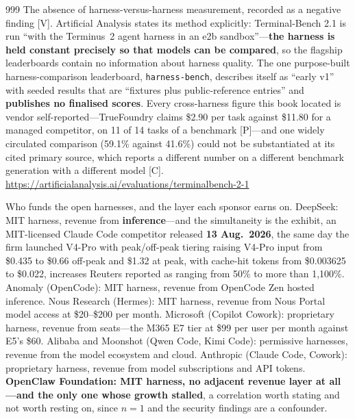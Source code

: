 \begin{thebibliography}{999}
 The absence of harness-versus-harness measurement, recorded as a negative finding [V]. Artificial Analysis states its method explicitly: Terminal-Bench 2.1 is run ``with the Terminus~2 agent harness in an e2b sandbox''---\textbf{the harness is held constant precisely so that models can be compared}, so the flagship leaderboards contain no information about harness quality. The one purpose-built harness-comparison leaderboard, \texttt{harness-bench}, describes itself as ``early v1'' with seeded results that are ``fixtures plus public-reference entries'' and \textbf{publishes no finalised scores}. Every cross-harness figure this book located is vendor self-reported---TrueFoundry claims \$2.90 per task against \$11.80 for a managed competitor, on 11 of 14 tasks of a benchmark [P]---and one widely circulated comparison (59.1\% against 41.6\%) could not be substantiated at its cited primary source, which reports a different number on a different benchmark generation with a different model [C]. \url{https://artificialanalysis.ai/evaluations/terminalbench-2-1}

 Who funds the open harnesses, and the layer each sponsor earns on. DeepSeek: MIT harness, revenue from \textbf{inference}---and the simultaneity is the exhibit, an MIT-licensed Claude Code competitor released \textbf{13 Aug.\ 2026}, the same day the firm launched V4-Pro with peak/off-peak tiering raising V4-Pro input from \$0.435 to \$0.66 off-peak and \$1.32 at peak, with cache-hit tokens from \$0.003625 to \$0.022, increases Reuters reported as ranging from 50\% to more than 1,100\%. Anomaly (OpenCode): MIT harness, revenue from OpenCode Zen hosted inference. Nous Research (Hermes): MIT harness, revenue from Nous Portal model access at \$20--\$200 per month. Microsoft (Copilot Cowork): proprietary harness, revenue from seats---the M365 E7 tier at \$99 per user per month against E5's \$60. Alibaba and Moonshot (Qwen Code, Kimi Code): permissive harnesses, revenue from the model ecosystem and cloud. Anthropic (Claude Code, Cowork): proprietary harness, revenue from model subscriptions and API tokens. \textbf{OpenClaw Foundation: MIT harness, no adjacent revenue layer at all---and the only one whose growth stalled}, a correlation worth stating and not worth resting on, since $n=1$ and the security findings are a confounder.


\end{thebibliography}
